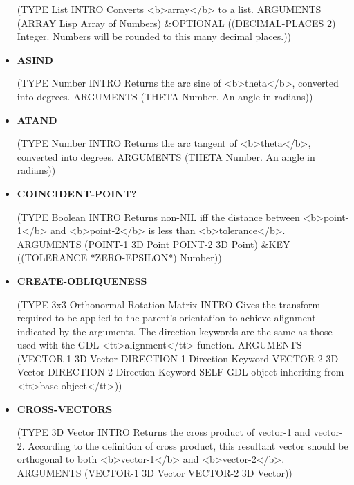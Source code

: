 \documentclass [11pt]{book}
\begin{document}
\begin{itemize}
(TYPE List INTRO  Converts <b>array</b> to a list.
 ARGUMENTS (ARRAY Lisp Array of Numbers) \&OPTIONAL ((DECIMAL-PLACES 2) Integer. Numbers will be rounded to this many decimal places.))



\item {}
\label{prim:asind}
\textbf{ASIND}

(TYPE Number INTRO  Returns the arc sine of <b>theta</b>, converted into degrees.
 ARGUMENTS (THETA Number. An angle in radians))



\item {}
\label{prim:atand}
\textbf{ATAND}

(TYPE Number INTRO  Returns the arc tangent of <b>theta</b>, converted into degrees.
 ARGUMENTS (THETA Number. An angle in radians))



\item {}
\label{prim:coincident-point?}
\textbf{COINCIDENT-POINT?}

(TYPE Boolean INTRO  Returns non-NIL iff the distance between <b>point-1</b> and <b>point-2</b>
is less than <b>tolerance</b>.
 ARGUMENTS (POINT-1 3D Point POINT-2 3D Point) \&KEY ((TOLERANCE *ZERO-EPSILON*) Number))



\item {}
\label{prim:create-obliqueness}
\textbf{CREATE-OBLIQUENESS}

(TYPE 3x3 Orthonormal Rotation Matrix INTRO  Gives the transform required
to be applied to the parent's orientation to achieve alignment
indicated by the arguments. The direction keywords are the same
as those used with the GDL <tt>alignment</tt> function.
 ARGUMENTS (VECTOR-1 3D Vector DIRECTION-1 Direction Keyword VECTOR-2 3D Vector DIRECTION-2 Direction Keyword SELF GDL object inheriting from <tt>base-object</tt>))



\item {}
\label{prim:cross-vectors}
\textbf{CROSS-VECTORS}

(TYPE 3D Vector INTRO  Returns the cross product of vector-1 and vector-2. According to
the definition of cross product, this resultant vector should be orthogonal
to both <b>vector-1</b> and <b>vector-2</b>.
 ARGUMENTS (VECTOR-1 3D Vector VECTOR-2 3D Vector))




\end{itemize}
\end{document}
